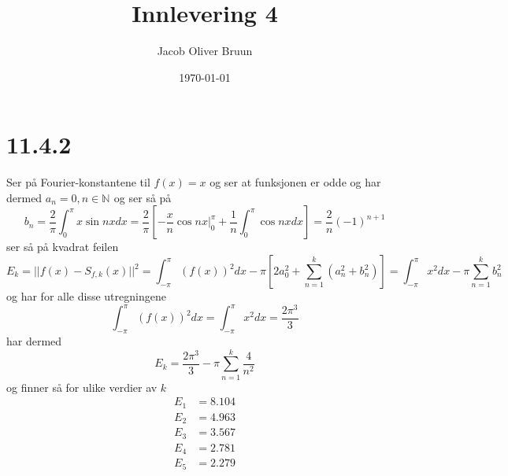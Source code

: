 \documentclass{report}
\title{Innlevering 4}
\author{Jacob Oliver Bruun}
\date{\today}
\newcommand{\M}[2]{\mathbb{#1}^{#2}}
\newcommand{\nbrack}[1]{\left( #1 \right)}
\newcommand{\bbrack}[1]{\left[ #1 \right]}
\begin{document}
\section*{11.4.2}
Ser på Fourier-konstantene til $f(x) = x$ og ser at funksjonen er odde og har dermed $a_{n} = 0, n \in \M{N}{}$ og ser så på
\begin{equation}
  \label{eq:2}
  b_{n} = \frac{2}{\pi} \int_{0}^{\pi} x \sin nx dx
  = \frac{2}{\pi} \bbrack{ -\frac{x}{n} \cos nx \Big|_{0}^{\pi} + \frac{1}{n} \int_{0}^{\pi} \cos nx dx } = \frac{2}{n} (-1)^{n+1}
\end{equation}
ser så på kvadrat feilen
\begin{equation}
  \label{eq:4}
  E_{k} = || f(x) - S_{f, k}(x) ||^{2} = \int_{-\pi}^{\pi} \nbrack{ f(x) }^{2} dx - \pi \bbrack{ 2a_{0}^{2} + \sum_{n=1}^{k} \nbrack{ a_{n}^{2} + b_{n}^{2} }} = \int_{-\pi}^{\pi} x^{2}dx - \pi \sum_{n=1}^{k}b_{n}^{2}
\end{equation}
og har for alle disse utregningene
\begin{equation}
  \label{eq:6}
  \int_{-\pi}^{\pi} \nbrack{ f(x) }^{2}dx = \int_{-\pi}^{\pi} x^{2} dx = \frac{2\pi^{3}}{3}
\end{equation}
har dermed
\begin{equation}
  \label{eq:7}
  E_{k} = \frac{2\pi^{3}}{3} - \pi \sum_{n=1}^{k} \frac{4}{n^{2}}
\end{equation}
og finner så for ulike verdier av $k$
\begin{equation}
  \label{eq:8}
  \begin{split}
    E_{1} &= 8.104 \\
    E_{2} &= 4.963 \\
    E_{3} &= 3.567 \\
    E_{4} &= 2.781 \\
    E_{5} &= 2.279 \\
  \end{split}
\end{equation}
\end{document}
